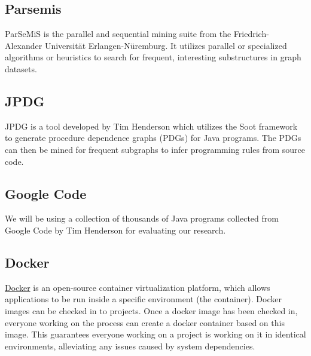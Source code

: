 \documentclass[12pt]{article}
\begin{document}
\subsection{Parsemis}
ParSeMiS is the parallel and sequential mining suite from the Friedrich-Alexander Universit{\"a}t Erlangen-N{\"u}remburg. It utilizes parallel or specialized algorithms or heuristics to search for frequent, interesting substructures in graph datasets.

\subsection{JPDG}
\label{subsection:JPDG}
JPDG is a tool developed by Tim Henderson which utilizes the Soot framework to generate procedure dependence graphs (PDGs) for Java programs. The PDGs can then be mined for frequent subgraphs to infer programming rules from source code.

\subsection{Google Code}
We will be using a collection of thousands of Java programs collected from Google Code by Tim Henderson for evaluating our research.

\subsection{Docker}
\label{subsection:Docker}
\href{http://www.docker.com}{Docker} is an open-source container virtualization platform, which allows applications to be run inside a specific environment (the container). Docker images can be checked in to projects. Once a docker image has been checked in, everyone working on the process can create a docker container based on this image. This guarantees everyone working on a project is working on it in identical environments, alleviating any issues caused by system dependencies.

\pagebreak


\end{document}

